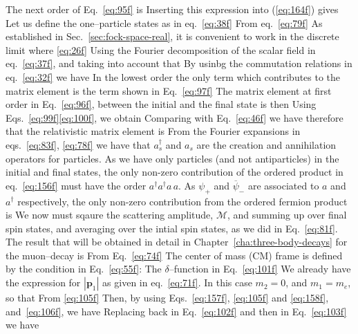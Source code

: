 \label{eq:95f}
The next order of Eq.~\eqref{eq:95f} is
  \label{eq:163f}
\label{eq:164f}
Inserting this expression into (\ref{eq:164f}) gives
  \label{eq:97f}
Let us define the one--particle states as in eq.~\eqref{eq:38f}
From eq.~\eqref{eq:79f} 
  \label{eq:77f}
As established in Sec.~\ref{sec:fock-space-real}, it is convenient to work in the discrete limit where \eqref{eq:26f}
Using the Fourier decomposition  of the scalar field in eq.~\eqref{eq:37f}, and taking into account that 
\label{eq:98f}
By usinbg the commutation relations in eq.~\eqref{eq:32f} we have
  \label{eq:99f}
  \label{eq:100f}
In the lowest order the only term which contributes to the matrix element is the term shown in Eq.~\eqref{eq:97f}
The matrix element at first order in Eq.~\eqref{eq:96f}, between the initial and the final state is then
Using Eqs.~\eqref{eq:99f}\eqref{eq:100f}, we obtain
Comparing with Eq.~\eqref{eq:46f} we have therefore that the relativistic matrix element is
  \label{eq:96f}
\label{eq:156f}
From the Fourier expansions in eqs.~\eqref{eq:83f}, \eqref{eq:78f} we have that $a_s^\dagger$ and $a_s$ are the creation and annihilation operators for particles. As we have only particles (and not antiparticles) in the initial and final states, the only non-zero contribution of the ordered product in eq.~\eqref{eq:156f} must have the order $a^\dagger a^\dagger a\, a$. As $\psi_+$ and $\overline{\psi}_-$ are associated to $a$ and $a^\dagger$ respectively, the only non-zero contribution from the ordered fermion product is
  \label{eq:101f}
We now must sqaure the scattering amplitude, $\mathcal{M}$, and summing up over final spin states, and averaging over the intial spin states, as we did in Eq.~\eqref{eq:81f}. The result that will be obtained in detail in Chapter~\ref{cha:three-body-decays} for the muon--decay is
  \label{eq:102f}
From Eq.~\eqref{eq:74f}
  \label{eq:103f}
The center of mass (CM) frame is defined by the condition in Eq.~\eqref{eq:55f}:
The $\delta$--function in Eq.~\eqref{eq:101f}
  \label{eq:157f}
\label{eq:104f}
  \label{eq:105f}
We already have the expression for $|\mathbf{p}_1|$ as given in eq.~\eqref{eq:71f}. In this case $m_2=0$, and $m_1=m_e$, so that
  \label{eq:158f}
From \eqref{eq:105f}
  \label{eq:106f}
Then, by using Eqs.~\eqref{eq:157f}, \eqref{eq:105f} and \eqref{eq:158f}, and~\eqref{eq:106f},  we have
Replacing back in Eq.~\eqref{eq:102f} and then in Eq.~\eqref{eq:103f} we have
